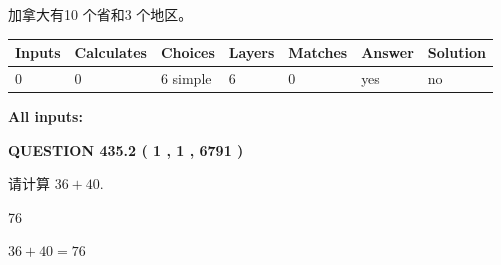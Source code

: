 \documentclass{ctexart}
\begin{document}
 
加拿大有10 个省和3 个地区。
 
 
\noindent{}
 
 
   
   
   
   
\noindent\begin{tabular}{|l|l|l|l|l|l|l|}
 \hline
Inputs & Calculates & Choices & Layers & Matches & Answer & Solution \\ \hline
 0  & 
 0  & 
 6
  simple  
  & 
 6  & 
 0  & 
  yes & 
  no 
  \\ \hline
 \end{tabular}
   
   
   
   
\noindent{}
   
   
   
   
\noindent\vspace{0.1in}\hspace{-0.08in} {\textbf{\Large{All inputs: }}}
   
   
  
\vspace{0.2in}
  
{\textbf{\Large{QUESTION
435.2 
 ( 1 , 1 , 6791 )
}}}
  
  
 
请计算 $ %
36 +  %
40 $.
 
 
 
\noindent{}
 
 

76
 
 
\noindent{}
 
 

 
 
 
\noindent{}
 
 

$ %
36 +  %
40=   %
76$
 
 
\noindent{}
 
 

 
   
   
   
\end{document}
